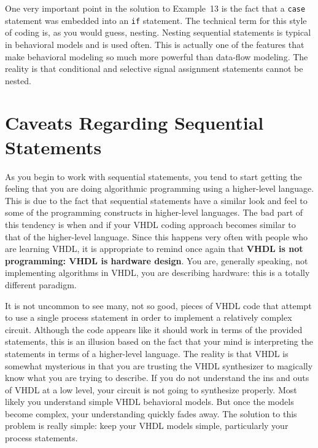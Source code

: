 One very important point in the solution to Example~13 is the fact that a \texttt{case} statement was embedded into an \texttt{if} statement. The technical term for this style of coding is, as you would guess, nesting. Nesting sequential statements is typical in behavioral models and is used often. This is actually one of the features that make behavioral modeling so much more powerful than data-flow modeling. The reality is that conditional and selective signal assignment statements cannot be nested.

\section{Caveats Regarding Sequential Statements}
As you begin to work with sequential statements, you tend to start getting the feeling that you are doing algorithmic programming using a higher-level language. This is due to the fact that sequential statements have a similar look and feel to some of the programming constructs in higher-level languages. The bad part of this tendency is when and if your VHDL coding approach becomes similar to that of the higher-level language. Since this happens very often with people who are learning VHDL, it is appropriate to remind once again that \textbf{VHDL is not programming: VHDL is hardware design}. You are, generally speaking, not implementing algorithms in VHDL, you are describing hardware: this is a totally different paradigm.

It is not uncommon to see many, not so good, pieces of VHDL code that attempt to use a single process statement in order to implement a relatively complex circuit. Although the code appears like it should work in terms of the provided statements, this is an illusion based on the fact that your mind is interpreting the statements in terms of a higher-level language. The reality is that VHDL is somewhat mysterious in that you are trusting the VHDL synthesizer to magically know what you are trying to describe. If you do not understand the ins and outs of VHDL at a low level, your circuit is not going to synthesize properly. Most likely you understand simple VHDL behavioral models. But once the models become complex, your understanding quickly fades away. The solution to this problem is really simple: keep your VHDL models simple, particularly your process statements.

